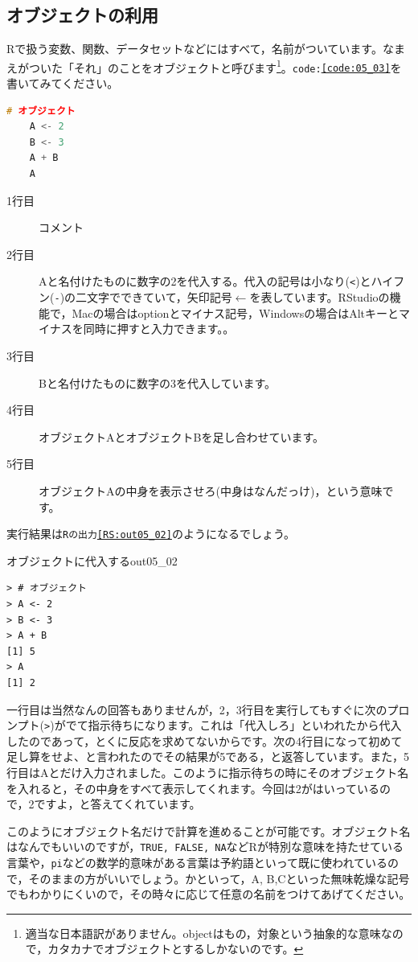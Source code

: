 \documentclass{ltjsbook}
\begin{document}
\subsection{オブジェクトの利用}
Rで扱う変数、関数、データセットなどにはすべて，名前がついています。なまえがついた「それ」のことをオブジェクトと呼びます\footnote{適当な日本語訳がありません。objectはもの，対象という抽象的な意味なので，カタカナでオブジェクトとするしかないのです。}。\texttt{code:\ref{code:05_03}}を書いてみてください。
\begin{lstlisting}[language=c++,label={code:05_03},caption={オブジェクトに代入}]
	# オブジェクト
	A <- 2
	B <- 3
	A + B
	A
\end{lstlisting}
\begin{description}
	\item[1行目] コメント
	\item[2行目] Aと名付けたものに数字の2を代入する。代入の記号は小なり(\verb|<|)とハイフン(\verb|-|)の二文字でできていて，矢印記号$\leftarrow$を表しています。RStudioの機能で，Macの場合はoptionとマイナス記号，Windowsの場合はAltキーとマイナスを同時に押すと入力できます。。
	\item[3行目] Bと名付けたものに数字の3を代入しています。
	\item[4行目] オブジェクトAとオブジェクトBを足し合わせています。
	\item[5行目] オブジェクトAの中身を表示させろ(中身はなんだっけ)，という意味です。
\end{description}

実行結果は\texttt{Rの出力\ref{RS:out05_02}}のようになるでしょう。
\begin{Rscreen}{オブジェクトに代入する}{out05_02}
	\begin{verbatim}
> # オブジェクト
> A <- 2
> B <- 3
> A + B
[1] 5
> A 
[1] 2
\end{verbatim}
\end{Rscreen}
一行目は当然なんの回答もありませんが，2，3行目を実行してもすぐに次のプロンプト(\verb|>|)がでて指示待ちになります。これは「代入しろ」といわれたから代入したのであって，とくに反応を求めてないからです。次の4行目になって初めて足し算をせよ、と言われたのでその結果が5である，と返答しています。また，5行目はAとだけ入力されました。このように指示待ちの時にそのオブジェクト名を入れると，その中身をすべて表示してくれます。今回は2がはいっているので，2ですよ，と答えてくれています。

このようにオブジェクト名だけで計算を進めることが可能です。オブジェクト名はなんでもいいのですが，\texttt{TRUE, FALSE, NA}などRが特別な意味を持たせている言葉や，\texttt{pi}などの数学的意味がある言葉は予約語といって既に使われているので，そのままの方がいいでしょう。かといって，A, B,Cといった無味乾燥な記号でもわかりにくいので，その時々に応じて任意の名前をつけてあげてください。
\end{document}
